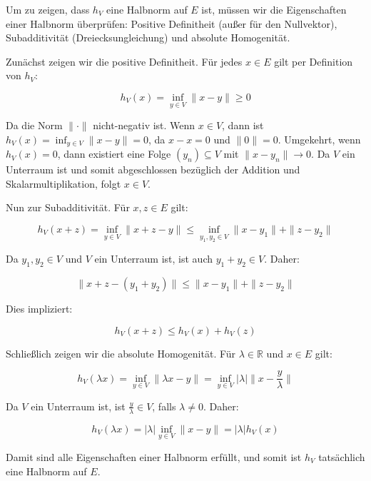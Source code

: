 Um zu zeigen, dass \( h_V \) eine Halbnorm auf \( E \) ist, müssen wir die Eigenschaften einer Halbnorm überprüfen: Positive Definitheit (außer für den Nullvektor), Subadditivität (Dreiecksungleichung) und absolute Homogenität.

Zunächst zeigen wir die positive Definitheit. Für jedes \( x \in E \) gilt per Definition von \( h_V \):

\[
h_V(x) = \inf_{y \in V} \|x - y\| \geq 0
\]

Da die Norm \(\|\cdot\|\) nicht-negativ ist. Wenn \( x \in V \), dann ist \( h_V(x) = \inf_{y \in V} \|x - y\| = 0 \), da \( x - x = 0 \) und \(\|0\| = 0\). Umgekehrt, wenn \( h_V(x) = 0 \), dann existiert eine Folge \((y_n) \subseteq V\) mit \(\|x - y_n\| \to 0\). Da \( V \) ein Unterraum ist und somit abgeschlossen bezüglich der Addition und Skalarmultiplikation, folgt \( x \in V \).

Nun zur Subadditivität. Für \( x, z \in E \) gilt:

\[
h_V(x + z) = \inf_{y \in V} \|x + z - y\| \leq \inf_{y_1, y_2 \in V} \|x - y_1\| + \|z - y_2\|
\]

Da \( y_1, y_2 \in V \) und \( V \) ein Unterraum ist, ist auch \( y_1 + y_2 \in V \). Daher:

\[
\|x + z - (y_1 + y_2)\| \leq \|x - y_1\| + \|z - y_2\|
\]

Dies impliziert:

\[
h_V(x + z) \leq h_V(x) + h_V(z)
\]

Schließlich zeigen wir die absolute Homogenität. Für \( \lambda \in \mathbb{R} \) und \( x \in E \) gilt:

\[
h_V(\lambda x) = \inf_{y \in V} \|\lambda x - y\| = \inf_{y \in V} |\lambda|\|x - \frac{y}{\lambda}\|
\]

Da \( V \) ein Unterraum ist, ist \(\frac{y}{\lambda} \in V\), falls \(\lambda \neq 0\). Daher:

\[
h_V(\lambda x) = |\lambda| \inf_{y \in V} \|x - y\| = |\lambda| h_V(x)
\]

Damit sind alle Eigenschaften einer Halbnorm erfüllt, und somit ist \( h_V \) tatsächlich eine Halbnorm auf \( E \).